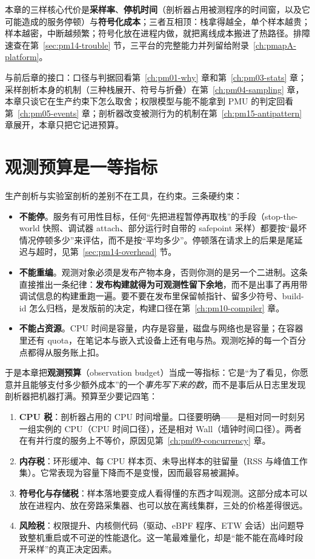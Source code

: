\documentclass[12pt,a4paper,fontset=fandol]{ctexbook}
\newcommand{\Lang}[1]{\textsf{#1}}
\newcommand{\MWall}{\Lang{Wall}}
\newcommand{\MCpu}{\Lang{CPU}}
\newcommand{\Mx}[1]{\textsf{#1}}
\begin{document}
本章的三样核心代价是\textbf{采样率}、\textbf{停机时间}（剖析器占用被测程序的时间窗，以及它可能造成的服务停顿）与\textbf{符号化成本}；三者互相顶：栈拿得越全，单个样本越贵；样本越密，中断越频繁；符号化放在进程内做，就把离线成本搬进了热路径。排障速查在第~\ref{sec:pm14-trouble} 节，三平台的完整能力并列留给附录~\ref{ch:pmapA-platform}。

与前后章的接口：口径与判据回看第~\ref{ch:pm01-why} 章和第~\ref{ch:pm03-stats} 章；采样剖析本身的机制（三种栈展开、符号与折叠）在第~\ref{ch:pm04-sampling} 章，本章只谈它在生产约束下怎么取舍；权限模型与能不能拿到 PMU 的判定回看第~\ref{ch:pm05-events} 章；剖析器改变被测行为的机制在第~\ref{ch:pm15-antipattern} 章展开，本章只把它记进预算。

\section{观测预算是一等指标}
\label{sec:pm14-budget}

生产剖析与实验室剖析的差别不在工具，在约束。三条硬约束：

\begin{itemize}
  \item \textbf{不能停}。服务有可用性目标，任何``先把进程暂停再取栈''的手段（\Mx{stop-the-world} 快照、调试器 attach、部分运行时自带的 safepoint 采样）都要按``最坏情况停顿多少''来评估，而不是按``平均多少''。停顿落在请求上的后果是尾延迟与超时，见第~\ref{sec:pm14-overhead} 节。
  \item \textbf{不能重编}。观测对象必须是发布产物本身，否则你测的是另一个二进制。这条直接推出一条纪律：\textbf{发布构建就得为可观测性留下余地}，而不是出事了再用带调试信息的构建重跑一遍。要不要在发布里保留帧指针、留多少符号、build-id 怎么归档，是发版前的决定，构建口径在第~\ref{ch:pm10-compiler} 章。
  \item \textbf{不能占资源}。CPU 时间是容量，内存是容量，磁盘与网络也是容量；在容器里还有 quota，在笔记本与嵌入式设备上还有电与热。观测吃掉的每一个百分点都得从服务账上扣。
\end{itemize}

于是本章把\textbf{观测预算}（observation budget）当成一等指标：它是``为了看见，你愿意并且能够支付多少额外成本''的一个\emph{事先写下来的数}，而不是事后从日志里发现剖析器把机器打满。预算至少要记四笔：

\begin{enumerate}
  \item \textbf{CPU 税}：剖析器占用的 CPU 时间增量。口径要明确——是相对同一时刻另一组实例的 \MCpu{}（CPU 时间口径），还是相对 \MWall{}（墙钟时间口径）。两者在有并行度的服务上不等价，原因见第~\ref{ch:pm09-concurrency} 章。
  \item \textbf{内存税}：环形缓冲、每 CPU 样本页、未导出样本的驻留量（\Mx{RSS} 与峰值工作集）。它常表现为容量下降而不是变慢，因而最容易被漏掉。
  \item \textbf{符号化与存储税}：样本落地要变成人看得懂的东西才叫观测。这部分成本可以放在进程内、放在旁路采集器、也可以放在离线集群，三处的价格差得很远。
  \item \textbf{风险税}：权限提升、内核侧代码（驱动、eBPF 程序、ETW 会话）出问题导致整机重启或不可逆的性能退化。这一笔最难量化，却是``能不能在高峰时段开采样''的真正决定因素。
\end{enumerate}
\end{document}
